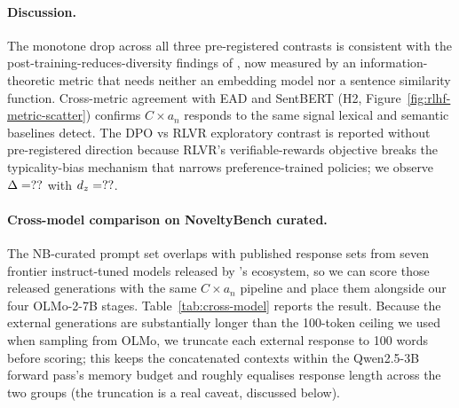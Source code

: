 \paragraph{Discussion.} The monotone drop across all three pre-registered contrasts is consistent with the post-training-reduces-diversity findings of \citet{kirk2023rlhf,padmakumar2023writingreduces}, now measured by an information-theoretic metric that needs neither an embedding model nor a sentence similarity function. Cross-metric agreement with EAD and SentBERT (H2, Figure~\ref{fig:rlhf-metric-scatter}) confirms $C \times a_n$ responds to the same signal lexical and semantic baselines detect. The DPO vs RLVR exploratory contrast is reported without pre-registered direction because RLVR's verifiable-rewards objective breaks the typicality-bias mechanism that narrows preference-trained policies; we observe $\Delta = ??$ with $d_z = ??$.

\paragraph{Cross-model comparison on NoveltyBench curated.} The NB-curated prompt set overlaps with published response sets from seven frontier instruct-tuned models released by \citet{zhang2025noveltybench}'s ecosystem, so we can score those released generations with the same $C \times a_n$ pipeline and place them alongside our four OLMo-2-7B stages. Table~\ref{tab:cross-model} reports the result. Because the external generations are substantially longer than the 100-token ceiling we used when sampling from OLMo, we truncate each external response to 100 words before scoring; this keeps the concatenated contexts within the Qwen2.5-3B forward pass's memory budget and roughly equalises response length across the two groups (the truncation is a real caveat, discussed below).

\begin{table}[h]
\centering
\caption{Cross-model $D = C \times a_n$ (per-byte) on the \olmoNbCuratedN{} NoveltyBench curated prompts, $K=10$ responses per prompt. Our four OLMo-2-7B stages were sampled for this paper (temperature 1, $\texttt{max\_new\_tokens}{=}100$); the external frontier-model responses are the released 10-sample generations from \citet{zhang2025noveltybench}'s ecosystem (\texttt{alon-albalak/*-noveltybench-responses}), truncated to 100 words before scoring. All runs share the same Qwen2.5-3B scorer $\theta$ and 25 permutations.}
\label{tab:cross-model}
\small
{}
\end{table}


